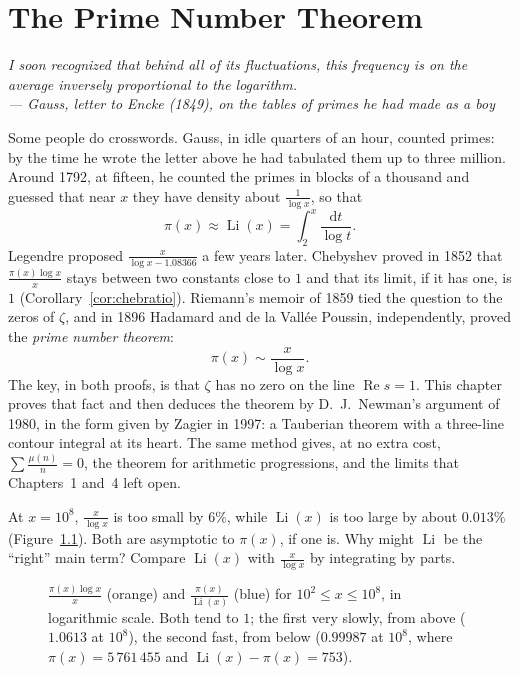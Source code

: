 \chapter{The Prime Number Theorem}

\begin{center}\itshape
I soon recognized that behind all of its fluctuations, this frequency is on the average inversely proportional to the logarithm.\\
\upshape --- Gauss, letter to Encke (1849), on the tables of primes he had made as a boy
\end{center}

Some people do crosswords. Gauss, in idle quarters of an hour, counted primes: by the time he wrote the letter above he had tabulated them up to three
million. Around 1792, at fifteen, he counted the primes in blocks of a thousand and guessed that near $x$ they have density about $\frac1{\log x}$, so that
\[
\pi(x)\approx\operatorname{Li}(x)=\int_2^x\frac{\mathrm dt}{\log t}.
\]
Legendre proposed $\frac x{\log x-1.08366}$ a few years later. Chebyshev proved in 1852 that $\frac{\pi(x)\log x}x$ stays between two constants close to $1$ and that its
limit, if it has one, is $1$ (Corollary~\ref{cor:chebratio}). Riemann's memoir of 1859 tied the question to the zeros of $\zeta$, and in 1896 Hadamard and de la Vallée Poussin,
independently, proved the \emph{prime number theorem}:
\[
\pi(x)\sim\frac x{\log x}.
\]
The key, in both proofs, is that $\zeta$ has no zero on the line $\operatorname{Re}s=1$. This chapter proves that fact and then deduces the theorem by D.~J.~Newman's
argument of 1980, in the form given by Zagier in 1997: a Tauberian theorem with a three-line contour integral at its heart. The same method gives, at no extra cost,
$\sum\frac{\mu(n)}n=0$, the theorem for arithmetic progressions, and the limits that Chapters~1 and~4 left open.

\begin{think}
At $x=10^8$, $\frac x{\log x}$ is too small by $6\%$, while $\operatorname{Li}(x)$ is too large by about $0.013\%$ (Figure~\ref{fig:pnt}). Both are asymptotic to $\pi(x)$, if one is.
Why might $\operatorname{Li}$ be the ``right'' main term? Compare $\operatorname{Li}(x)$ with $\frac x{\log x}$ by integrating by parts.
\end{think}

\begin{figure}[ht]
\centering
{}
\caption{$\frac{\pi(x)\log x}x$ (orange) and $\frac{\pi(x)}{\operatorname{Li}(x)}$ (blue) for $10^2\le x\le10^8$, in logarithmic scale. Both tend to $1$; the first very slowly, from above
($1.0613$ at $10^8$), the second fast, from below ($0.99987$ at $10^8$, where $\pi(x)=5\,761\,455$ and $\operatorname{Li}(x)-\pi(x)=753$).}
\label{fig:pnt}
\end{figure}

